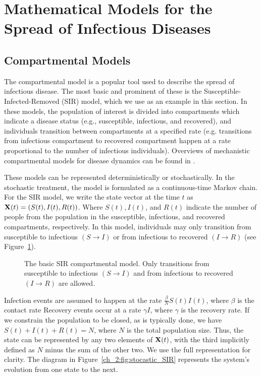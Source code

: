 \section{Mathematical Models for the Spread of Infectious Diseases}
\label{sec:math_models}

\subsection{Compartmental Models}

The compartmental model is a popular tool used to describe the spread of infectious disease.
The most basic and prominent of these is the Susceptible-Infected-Removed (SIR) model, which we use as an example in this section.
In these models, the population of interest is divided into compartments which indicate a disease status (e.g., susceptible, infectious, and recovered), and individuals transition between compartments at a specified rate
(e.g. transitions from infectious compartment to recovered compartment happen at a rate proportional to the number of infectious individuals).
Overviews of mechanistic compartmental models for disease dynamics can be found in \citet{anderson1992infectious, Brauer2008, keeling2011modeling, 10.1093/aje/kww021}.

These models can be represented deterministically or stochastically.
In the stochastic treatment, the model is formulated as a continuous-time Markov chain.
For the SIR model, we write the state vector at the time \( t \) as \( \mathbf{X}(t) = (S(t), I(t), R(t)) \).
Where \( S(t), I(t) \), and \( R(t) \) indicate the number of people from the population in the susceptible, infectious, and recovered compartments, respectively.
In this model, individuals may only transition from susceptible to infectious \( (S \to I) \) or from infectious to recovered \( (I \to R) \) (see Figure~\ref{ch_2:fig:SIR_diagram}).
\begin{figure}
    \centering
    \caption[The basic SIR compartmental model.]{The basic SIR compartmental model.
    Only transitions from susceptible to infectious \( (S \to I) \) and from infectious to recovered \( (I \to R) \) are allowed.}
    \label{ch_2:fig:SIR_diagram}
\end{figure}
Infection events are assumed to happen at the rate \( \frac{\beta}{N} S(t) I(t) \), where \( \beta \) is the contact rate
Recovery events occur at a rate \( \gamma I \), where \( \gamma \) is the recovery rate.
If we constrain the population to be closed, as is typically done, we have \(  S(t) + I(t) + R(t) = N \), where \( N \) is the total population size.
Thus, the state can be represented by any two elements of \( \mathbf{X} (t) \), with the third implicitly defined as \( N \) minus the sum of the other two.
We use the full representation for clarity.
The diagram in Figure~\ref{ch_2:fig:stocastic_SIR} represents the system's evolution from one state to the next.

